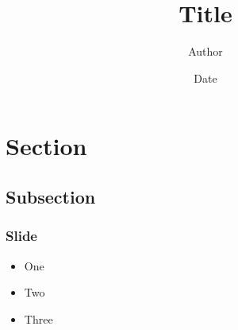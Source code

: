 \documentclass{beamer}
\author{Author}
\title{Title}
\date{Date}
\begin{document}
\maketitle

\section{Section}

\subsection{Subsection}

\begin{frame}
  \frametitle{Slide}

  \begin{itemize}

    \item One

    \item Two

    \item Three

  \end{itemize}

\end{frame}
\end{document}
